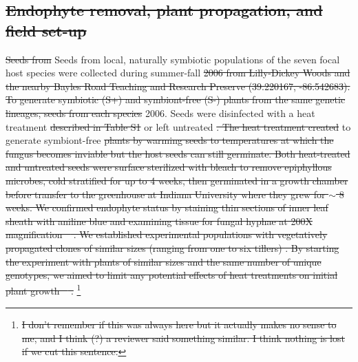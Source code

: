 \documentclass[lineno, sn-basic]{sn-jnl}%
\providecommand{\DIFadd}[1]{{\protect\color{blue}#1}} %
\providecommand{\DIFdel}[1]{{\protect\color{red}\protect\scriptsize\sout{#1}}}
\providecommand{\DIFadd}[1]{{\protect\color{blue}\uwave{#1}}} %
\providecommand{\DIFdel}[1]{{\protect\color{red}\sout{#1}}}                      %
\providecommand{\DIFaddbegin}{} %
\providecommand{\DIFaddend}{} %
\providecommand{\DIFdelbegin}{} %
\providecommand{\DIFdelend}{} %
\newcommand{\DIFscaledelfig}{0.5}
\newlength{\DIFdelgraphicswidth} %
\newlength{\DIFdelgraphicsheight} %
\newcommand{\DIFaddincludegraphics}[2][]{{\color{blue}\fbox{\DIFOincludegraphics[#1]{#2}}}} %
\newcommand{\DIFdelincludegraphics}[2][]{%
\sbox{\DIFdelgraphicsbox}{\DIFOincludegraphics[#1]{#2}}%
\settoboxwidth{\DIFdelgraphicswidth}{\DIFdelgraphicsbox} %
\settoboxtotalheight{\DIFdelgraphicsheight}{\DIFdelgraphicsbox} %
\scalebox{\DIFscaledelfig}{%
\parbox[b]{\DIFdelgraphicswidth}{\usebox{\DIFdelgraphicsbox}\\[-\baselineskip] \rule{\DIFdelgraphicswidth}{0em}}\llap{\resizebox{\DIFdelgraphicswidth}{\DIFdelgraphicsheight}{%
\setlength{\unitlength}{\DIFdelgraphicswidth}%
\begin{picture}(1,1)%
\thicklines\linethickness{2pt} %
{\color[rgb]{1,0,0}\put(0,0){\framebox(1,1){}}}%
{\color[rgb]{1,0,0}\put(0,0){\line( 1,1){1}}}%
{\color[rgb]{1,0,0}\put(0,1){\line(1,-1){1}}}%
\end{picture}%
}\hspace*{3pt}}} %
} %
\DeclareRobustCommand{\DIFaddbegin}{\DIFOaddbegin \let\includegraphics\DIFaddincludegraphics} %
\DeclareRobustCommand{\DIFaddend}{\DIFOaddend \let\includegraphics\DIFOincludegraphics} %
\DeclareRobustCommand{\DIFdelbegin}{\DIFOdelbegin \let\includegraphics\DIFdelincludegraphics} %
\DeclareRobustCommand{\DIFdelend}{\DIFOaddend \let\includegraphics\DIFOincludegraphics} %
\begin{document}
\DIFdelbegin \subsection*{\DIFdel{Endophyte removal, plant propagation, and field set-up}}
\DIFdel{Seeds from }\DIFdelend \DIFaddbegin \DIFadd{Seeds from local, }\DIFaddend naturally symbiotic populations of the seven focal host species were collected during summer-fall \DIFdelbegin \DIFdel{2006 from Lilly-Dickey Woods and the nearby Bayles Road Teaching and Research Preserve (39.220167, -86.542683). 
	To generate symbiotic (S+) and symbiont-free (S-) plants from the same genetic lineages, seeds from each species }\DIFdelend \DIFaddbegin \DIFadd{2006. 
Seeds }\DIFaddend were disinfected with a heat treatment \DIFdelbegin \DIFdel{described in Table S1 }\DIFdelend or left untreated \DIFdelbegin \DIFdel{. 
	The heat treatment created }\DIFdelend \DIFaddbegin \DIFadd{to generate }\DIFaddend symbiont-free \DIFdelbegin \DIFdel{plants by warming seeds to temperatures at which the fungus becomes inviable but the host seeds can still germinate.
	Both heat-treated and untreated seeds were surface sterilized with bleach to remove epiphyllous microbes, cold stratified for up to 4 weeks, then germinated in a growth chamber before transfer to the greenhouse at Indiana University where they grew for $\sim$ 8 weeks. 
	We confirmed endophyte status by staining thin sections of inner leaf sheath with aniline blue and examining tissue for fungal hyphae at 200X magnification \mbox{%
\cite{bacon2018stains}}\hspace{0pt}%
. 
	We established experimental populations with vegetatively propagated clones of similar sizes (ranging from one to six tillers) . 
	By starting the experiment with plants of similar sizes and the same number of unique genotypes, we aimed to limit any potential effects of heat treatments on initial plant growth \mbox{%
\cite{rudgers2009benefits}}\hspace{0pt}%
.
}\footnote{\DIFdel{I don't remember if this was always here but it actually makes no sense to me, and I think (?) a reviewer said something similar. I think nothing is lost if we cut this sentence.}}
	
\addtocounter{footnote}{-1}%
\end{document}
